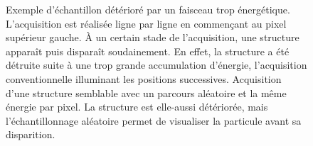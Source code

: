     \begin{figure}[t]
        \centering
        \hspace{1em}
        \caption{\protect{} Exemple d'échantillon détérioré par un faisceau trop énergétique. L'acquisition est réalisée ligne par ligne en commençant au pixel supérieur gauche. \`A un certain stade de l'acquisition, une structure apparaît puis disparaît soudainement. En effet, la structure a été détruite suite à une trop grande accumulation d'énergie, l'acquisition conventionnelle illuminant les positions successives. \protect{} Acquisition d'une structure semblable avec un parcours aléatoire et la même énergie par pixel. La structure est elle-aussi détériorée, mais l'échantillonnage aléatoire permet de visualiser la particule avant sa disparition.
            \protect\label{fig-echantillon-deteriore}}
    \end{figure}

